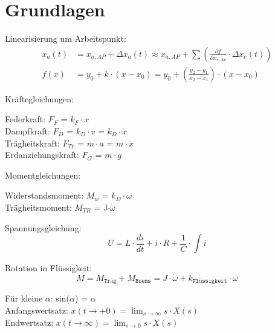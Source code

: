 \section{Grundlagen}
Linearisierung um Arbeitspunkt:
\begin{align*}
	x_{a}(t) &= x_{a,AP}+\Delta x_{a}(t) \approx x_{a,AP}+\sum\left(\frac{\partial f}{\partial x_{e,Ap}} \cdot \Delta x_{e}(t)\right)\\
	f(x) &= y_0 + k \cdot (x - x_0) = y_0 + \left(\frac{y_2 - y_1}{x_2 - x_1}\right) \cdot (x - x_0)
\end{align*}

Kräftegleichungen:
\begin{mdframed}[style=exercise]
	Federkraft: $F_F$ = $k_F \cdot x$\\
	Dampfkraft: $F_D$ = $k_D \cdot v$ = $k_D \cdot \dot{x}$\\
	Trägheitskraft: $F_{Tr}$ = $m\cdot a$ = $m\cdot \ddot{x}$\\
	Erdanziehungskraft: $F_G$ = $m\cdot g$
\end{mdframed}
Momentgleichungen:
\begin{mdframed}[style=exercise]
	Widerstandsmoment: $M_w$ = $k_D \cdot \omega$\\
	Trägheitsmoment: $M_{TR}$ = J$\cdot \dot{\omega}$
\end{mdframed}

Spannungsgleichung:
\[
	U = L\cdot \frac{di}{dt}+i\cdot R+\frac{1}{C} \cdot \int i
\]

Rotation in Flüssigkeit:
\[
	M=M_{\texttt{Träg}}+M_{\texttt{Brems}}= J \cdot \dot{\omega} +k_{\texttt{Flüssigkeit}} \cdot \omega
\]

Für kleine $\alpha$: sin($\alpha$) = $\alpha$\\
Anfangswertsatz: $x(t \rightarrow +0)=\lim _{s \rightarrow \infty} s \cdot X(s)$\\
Endwertsatz: $x(t \rightarrow \infty)=\lim _{s \rightarrow 0} s \cdot X(s)$